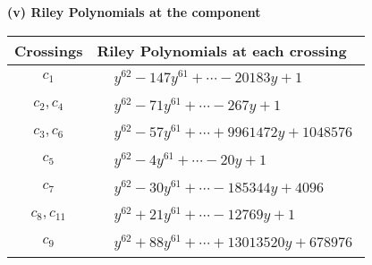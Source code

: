 \documentclass[1p]{elsarticle_modified}
\theoremstyle{definition}
\begin{document}
\newpage\renewcommand{\arraystretch}{1}
\flushleft \textbf{(v) Riley Polynomials at the component}\newline \\
\begin{tabular}{m{50pt}|m{274pt}}
Crossings & \hspace{64pt}Riley Polynomials at each crossing \\
\hline $$\begin{aligned}c_{1}\end{aligned}$$&$\begin{aligned}
&y^{62}-147 y^{61}+\cdots-20183 y+1
\end{aligned}$\\
\hline $$\begin{aligned}c_{2},c_{4}\end{aligned}$$&$\begin{aligned}
&y^{62}-71 y^{61}+\cdots-267 y+1
\end{aligned}$\\
\hline $$\begin{aligned}c_{3},c_{6}\end{aligned}$$&$\begin{aligned}
&y^{62}-57 y^{61}+\cdots+9961472 y+1048576
\end{aligned}$\\
\hline $$\begin{aligned}c_{5}\end{aligned}$$&$\begin{aligned}
&y^{62}-4 y^{61}+\cdots-20 y+1
\end{aligned}$\\
\hline $$\begin{aligned}c_{7}\end{aligned}$$&$\begin{aligned}
&y^{62}-30 y^{61}+\cdots-185344 y+4096
\end{aligned}$\\
\hline $$\begin{aligned}c_{8},c_{11}\end{aligned}$$&$\begin{aligned}
&y^{62}+21 y^{61}+\cdots-12769 y+1
\end{aligned}$\\
\hline $$\begin{aligned}c_{9}\end{aligned}$$&$\begin{aligned}
&y^{62}+88 y^{61}+\cdots+13013520 y+678976
\end{aligned}$\\

\end{tabular}
\end{document}
